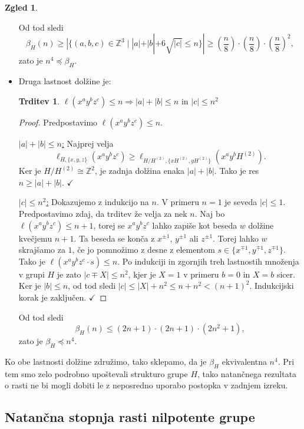 \documentclass[11pt]{book}
\def\ZZ{\mathbb{Z}}
\def\kljuka{$\checkmark$}
\theoremstyle{definition}
\theoremstyle{zgled}
\newtheorem*{zgled}{Zgled}
\theoremstyle{odprtproblem}
\theoremstyle{domacanaloga}
\newenvironment{dokaz}
    {\color{siva}\begin{proof}}
    {\end{proof}}
\theoremstyle{izrek}
\newtheorem*{trditev}{Trditev}
\begin{document}
\begin{zgled}
\begin{itemize}
Od tod sledi
\[
\beta_{H}(n) \geq |\{ (a,b,c) \in \ZZ^3 \mid |a| + |b| + 6 \sqrt{|c|} \leq n\}| \geq \left( \frac{n}{8} \right) \cdot \left( \frac{n}{8} \right) \cdot \left( \frac{n}{8} \right)^2,
\]
zato je $n^4 \preceq \beta_H$.

\item Druga lastnost dolžine je:

\begin{trditev}
$\ell(x^a y^b z^c) \leq n \Rightarrow |a| + |b| \leq n \text{ in } |c| \leq n^2$
\end{trditev}

\begin{dokaz}
Predpostavimo $\ell(x^a y^b z^c) \leq n$. 

\underline{$|a| + |b| \leq n$:} Najprej velja
\[
\ell_{H, \{ x, y, z \}}(x^a y^b z^c) \geq \ell_{H / H^{(2)}, \{ x H^{(2)}, y H^{(2)} \}}(x^a y^b H^{(2)}).
\]
Ker je $H / H^{(2)} \cong \ZZ^2$, je zadnja dolžina enaka $|a| + |b|$. Tako je res $n \geq |a| + |b|$. \kljuka

\underline{$|c| \leq n^2$:} Dokazujemo z indukcijo na $n$. V primeru $n = 1$ je seveda $|c| \leq 1$. Predpostavimo zdaj, da trditev že velja za nek $n$. Naj bo $\ell(x^a y^b z^c) \leq n + 1$, torej se $x^a y^b z^c$ lahko zapiše kot beseda $w$ dolžine kvečjemu $n+1$. Ta beseda se konča z $x^{\pm 1}$, $y^{\pm 1}$ ali $z^{\pm 1}$. Torej lahko $w$ skrajšamo za $1$, če jo pomnožimo z desne z elementom $s \in \{ x^{\mp 1}, y^{\mp 1}, z^{\mp 1} \}$. Tako je $\ell(x^a y^b z^c \cdot s) \leq n$. Po indukciji in zgornjih treh lastnostih množenja v grupi $H$ je zato $|c \mp X| \leq n^2$, kjer je $X = 1$ v primeru $b = 0$ in $X = b$ sicer. Ker je $|b| \leq n$, od tod sledi $|c| \leq |X| + n^2 \leq n + n^2 < (n+1)^2$. Indukcijski korak je zaključen. \kljuka
\end{dokaz}


Od tod sledi
\[
\beta_H(n) \leq (2n+1) \cdot (2n+1) \cdot (2n^2 + 1),
\]
zato je $\beta_H \preceq n^4$. 

\end{itemize}

Ko obe lastnosti dolžine združimo, tako sklepamo, da je $\beta_H$ ekvivalentna $n^4$. Pri tem smo zelo podrobno upoštevali strukturo grupe $H$, tako natančnega rezultata o rasti ne bi mogli dobiti le z neposredno uporabo postopka v zadnjem izreku.
\end{zgled}

\subsection{Natančna stopnja rasti nilpotente grupe}
\end{document}
